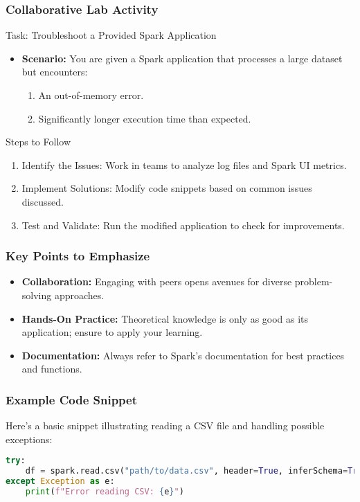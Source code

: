 \documentclass[aspectratio=169]{beamer}
\begin{document}
\begin{frame}[fragile]
    \frametitle{Collaborative Lab Activity}
    \begin{block}{Task: Troubleshoot a Provided Spark Application}
        \begin{itemize}
            \item \textbf{Scenario:} You are given a Spark application that processes a large dataset but encounters:
            \begin{enumerate}
                \item An out-of-memory error.
                \item Significantly longer execution time than expected.
            \end{enumerate}
        \end{itemize}
    \end{block}
    
    \begin{block}{Steps to Follow}
        \begin{enumerate}
            \item Identify the Issues: Work in teams to analyze log files and Spark UI metrics.
            \item Implement Solutions: Modify code snippets based on common issues discussed.
            \item Test and Validate: Run the modified application to check for improvements.
        \end{enumerate}
    \end{block}
\end{frame}

\begin{frame}[fragile]
    \frametitle{Key Points to Emphasize}
    \begin{itemize}
        \item \textbf{Collaboration:} Engaging with peers opens avenues for diverse problem-solving approaches.
        \item \textbf{Hands-On Practice:} Theoretical knowledge is only as good as its application; ensure to apply your learning.
        \item \textbf{Documentation:} Always refer to Spark’s documentation for best practices and functions.
    \end{itemize}
\end{frame}

\begin{frame}[fragile]
    \frametitle{Example Code Snippet}
    Here's a basic snippet illustrating reading a CSV file and handling possible exceptions:
    \begin{lstlisting}[language=Python]
try:
    df = spark.read.csv("path/to/data.csv", header=True, inferSchema=True)
except Exception as e:
    print(f"Error reading CSV: {e}")
    \end{lstlisting}
\end{frame}
\end{document}
